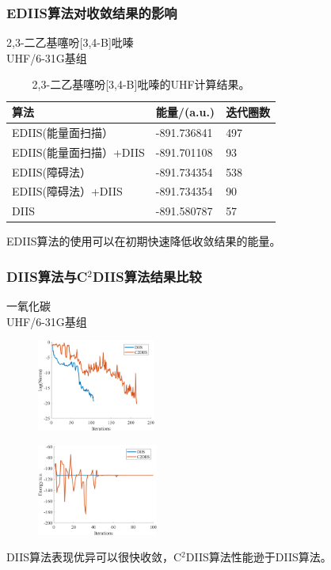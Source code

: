 \documentclass[10pt,aspectratio=43,mathserif,UTF8]{beamer}
\begin{document}
\begin{frame}
	\frametitle{EDIIS算法对收敛结果的影响}
	2,3-二乙基噻吩[3,4-B]吡嗪\\
	UHF/6-31G基组
	\begin{table}[htbp]
		\caption{2,3-二乙基噻吩[3,4-B]吡嗪的UHF计算结果。}\label{table:AA4}
		\setlength{\belowcaptionskip}{7pt}
		\centering
		\begin{tabular}{l l l}
			\toprule
			\textbf{算法}			&\textbf{能量/(a.u.)}	&\textbf{迭代圈数}\\
			\midrule
			EDIIS(能量面扫描）			&-891.736841		&497\\
			EDIIS(能量面扫描）+DIIS		&-891.701108		&93\\
			EDIIS(障碍法）				& -891.734354		&538\\
			EDIIS(障碍法）+DIIS			& -891.734354		&90\\
			DIIS						& -891.580787		&57\\
			\bottomrule
		\end{tabular}
		\vspace{0.2cm}
	\end{table}
	\centerline{EDIIS算法的使用可以在初期快速降低收敛结果的能量。}
\end{frame}

\begin{frame}
	\frametitle{DIIS算法与C$^2$DIIS算法结果比较}
	一氧化碳\\
	UHF/6-31G基组
	\begin{figure}[ht!]
		\centering
		\begin{minipage}{0.4\linewidth}
			\centering
			\includegraphics[height=3cm]{figure/co/LOG2.png}
			\label{fig:co:lognorm}
		\end{minipage}
		\begin{minipage}{0.4\linewidth}
			\centering
			\includegraphics[height=3cm]{figure/co/E3.png}
			\label{fig:co:E}
		\end{minipage}
		\label{fig:co}
	\end{figure}
	\centerline{DIIS算法表现优异可以很快收敛，C$^2$DIIS算法性能逊于DIIS算法。}
\end{frame}
\end{document}
